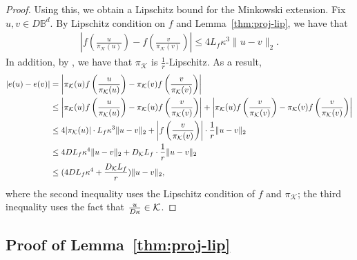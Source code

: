 \begin{proof}
Using this, we obtain a Lipschitz bound for the Minkowski extension. Fix $u,v\in D\mathbb{B}^d$. By Lipschitz condition on $f$ and Lemma~\ref{thm:proj-lip}, we have that
\begin{align*}
\left|f\left(\frac{u}{\pi_{\mathcal{K}}(u)}\right)-f\left(\frac{v}{\pi_{\mathcal{K}}(v)}\right)\right|\le 4L_f\kappa^3\|u-v\|_2. 
\end{align*}
In addition, by \cite{lu2023projection}, we have that $\pi_{\mathcal{K}}$ is $\frac{1}{r}$-Lipschitz.
As a result,
\begin{align*}
|e(u)-e(v)|&=\left|\pi_{\mathcal{K}}(u)f\left(\frac{u}{\pi_{\mathcal{K}}(u)}\right)-\pi_{\mathcal{K}}(v)f\left(\frac{v}{\pi_{\mathcal{K}}(v)}\right)\right|\\
&\le \left|\pi_{\mathcal{K}}(u)f\left(\frac{u}{\pi_{\mathcal{K}}(u)}\right)-\pi_{\mathcal{K}}(u)f\left(\frac{v}{\pi_{\mathcal{K}}(v)}\right)\right|+\left|\pi_{\mathcal{K}}(u)f\left(\frac{v}{\pi_{\mathcal{K}}(v)}\right)-\pi_{\mathcal{K}}(v)f\left(\frac{v}{\pi_{\mathcal{K}}(v)}\right)\right|\\
&\le 4|\pi_{\mathcal{K}}(u)|\cdot L_f\kappa^3\|u-v\|_2+\left|f\left(\frac{v}{\pi_{\mathcal{K}}(v)}\right)\right|\cdot \frac{1}{r}\|u-v\|_2\\
&\le 4 DL_f\kappa^4\|u-v\|_2+D_{\mathcal{K}}L_f\cdot \frac{1}{r}\|u-v\|_2\\
&\le (4DL_f\kappa^4+\frac{D_{\mathcal{K}}L_f}{r})\|u-v\|_2, 
\end{align*}
where the second inequality uses the Lipschitz condition of $f$ and $\pi_{\mathcal{K}}$; the third inequality uses the fact that $\frac{u}{D\kappa}\in \mathcal{K}$. 
\end{proof}

\subsection{Proof of Lemma~\ref{thm:proj-lip}}


